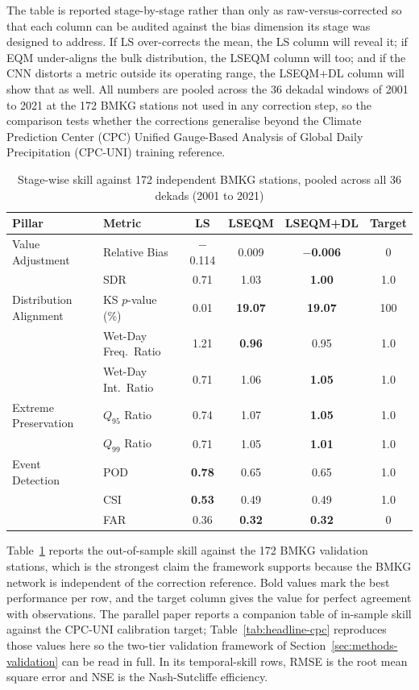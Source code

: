 The table is reported stage-by-stage rather than
only as raw-versus-corrected so that each column can be audited
against the bias dimension its stage was designed to address. If
LS over-corrects the mean, the LS column will reveal it; if EQM
under-aligns the bulk distribution, the LSEQM column will too;
and if the CNN distorts a metric outside its operating range,
the LSEQM+DL column will show that as well. All numbers are
pooled across the 36 dekadal windows of 2001 to 2021 at the 172
BMKG stations not used in any correction step, so the comparison
tests whether the corrections generalise beyond the Climate
Prediction Center (CPC) Unified Gauge-Based Analysis of Global
Daily Precipitation (CPC-UNI) training reference.

\begin{table}[H]
\centering
\caption[Stage-wise skill against 172 independent BMKG stations]{Stage-wise skill against 172 independent BMKG stations,
pooled across all 36 dekads (2001 to 2021)\label{tab:headline}}
\begingroup\small
\begin{tabular}{@{}llcccc@{}}
\toprule
Pillar & Metric & LS & LSEQM & LSEQM+DL & Target \\
\midrule
Value Adjustment
  & Relative Bias        & $-$0.114 & 0.009 & \textbf{$-$0.006} & 0 \\
  & SDR                  & 0.71 & 1.03 & \textbf{1.00} & 1.0 \\
Distribution Alignment
  & KS $p$-value (\%)    & 0.01 & \textbf{19.07} & \textbf{19.07} & 100 \\
  & Wet-Day Freq.\ Ratio & 1.21 & \textbf{0.96} & 0.95 & 1.0 \\
  & Wet-Day Int.\ Ratio  & 0.71 & 1.06 & \textbf{1.05} & 1.0 \\
Extreme Preservation
  & $Q_{95}$ Ratio       & 0.74 & 1.07 & \textbf{1.05} & 1.0 \\
  & $Q_{99}$ Ratio       & 0.71 & 1.05 & \textbf{1.01} & 1.0 \\
Event Detection
  & POD                  & \textbf{0.78} & 0.65 & 0.65 & 1.0 \\
  & CSI                  & \textbf{0.53} & 0.49 & 0.49 & 1.0 \\
  & FAR                  & 0.36 & \textbf{0.32} & \textbf{0.32} & 0 \\
\bottomrule
\end{tabular}
\endgroup
\end{table}

Table~\ref{tab:headline} reports the out-of-sample skill against
the 172 BMKG validation stations, which is the strongest claim
the framework supports because the BMKG network is independent
of the correction reference. Bold values mark the best
performance per row, and the target column gives the value for
perfect agreement with observations. The parallel paper
\citep{ref:istanto2026mdpi}\MDPIstatus reports a companion table
of in-sample skill against the CPC-UNI calibration target;
Table~\ref{tab:headline-cpc} reproduces those values here so the
two-tier validation framework of
Section~\ref{sec:methods-validation} can be read in full. In its
temporal-skill rows, RMSE is the root mean square error and NSE
is the Nash-Sutcliffe efficiency.

